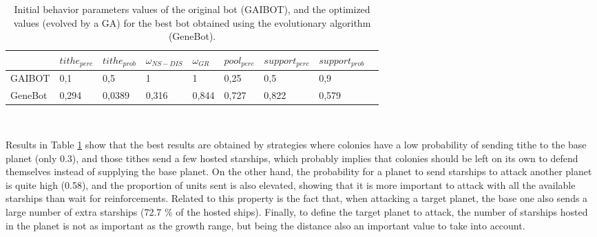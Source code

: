 \documentclass{llncs}
\begin{document}
\begin{table}[htp]
\centering
\begin{tabular}{|l|l|l|l|l|l|l|l|l|}
\hline
           & $tithe_{perc}$ & $tithe_{prob}$ & $\omega_{NS-DIS}$ & $\omega_{GR}$ & $pool_{perc}$  & $support_{perc}$ & $support_{prob}$ \\
\hline
GAIBOT &        0,1 &        0,5 &          1 &          1 &          0,25 &        0,5 &        0,9 \\
\hline
GeneBot &      0,294 &     0,0389 &      0,316 &      0,844 &        0,727 &      0,822 &      0,579 \\
\hline 
\end{tabular}
\\[1ex]
\caption{Initial behavior parameters values of the original bot
  (GAIBOT), and the optimized values (evolved by a GA) for the best
  bot obtained using the evolutionary algorithm (GeneBot).
\label{tab:tabla_valores} }
\end{table}

Results in Table \ref{tab:tabla_valores} show that the best results
are obtained by strategies where colonies have a low probability of
sending tithe to the base planet (only 0.3), and those tithes send a
few hosted starships, which probably implies that colonies should be
left on its own to defend themselves instead of supplying the base
planet. On the other hand, the probability for a planet to send
starships to attack another planet is quite high (0.58), and the
proportion of units sent is also elevated, showing that it is more
important to attack with all the available starships than wait for
reinforcements. Related to this property is the fact that, when
attacking a target planet, the base one also sends a large number of
extra starships (72.7 \% of the hosted ships). Finally, to define the
target planet to attack, the number of starships hosted in the planet
is not as important as the growth range, but being the distance also
an important value to take into account.  
\end{document}
